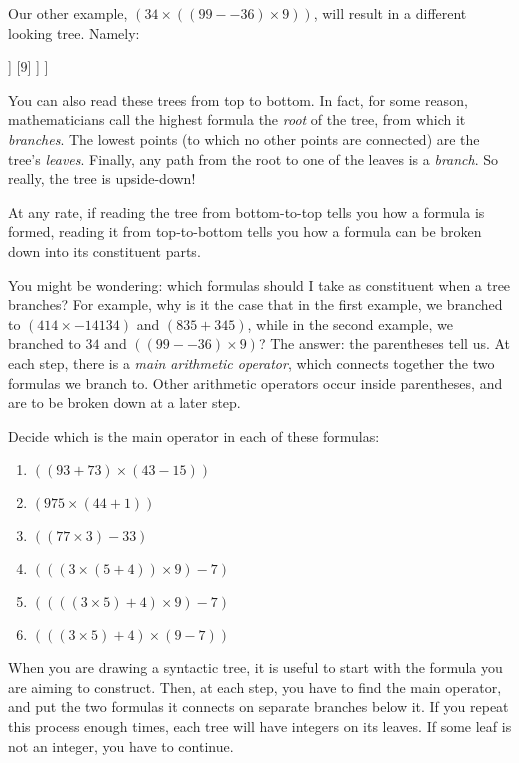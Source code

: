 Our other example, $(34 \times ((99- -36)\times 9))$, will result in a different looking tree. Namely:

\begin{center}
\begin{forest}
	[$(34 \times ((99- -36)\times 9))$
		[$34$]
		[$((99- -36)\times 9)$
			[$(99- -36)$
				[$99$]
				[$-36$]
			]
			[$9$]
		]
	]
\end{forest}
\end{center}

You can also read these trees from top to bottom. In fact, for some reason, mathematicians call the highest formula the \textit{root} of the tree, from which it \textit{branches}. The lowest points (to which no other points are connected) are the tree's \textit{leaves}. Finally, any path from the root to one of the leaves is a \textit{branch}. So really, the tree is upside-down! 

At any rate, if reading the tree from bottom-to-top tells you how a formula is formed, reading it from top-to-bottom tells you how a formula can be broken down into its constituent parts. 

You might be wondering: which formulas should I take as constituent when a tree branches? For example, why is it the case that in the first example, we branched to $(414 \times -14134)$ and $(835+345)$, while in the second example, we branched to $34$ and $((99- -36)\times 9)$? The answer: the parentheses tell us. At each step, there is a \textit{main arithmetic operator}, which connects together the two formulas we branch to. Other arithmetic operators occur inside parentheses, and are to be broken down at a later step. 

\begin{exc} \label{lae}
Decide which is the main operator in each of these formulas:

\begin{enumerate}
	\item $((93+73)\times(43-15))$
	\item $(975 \times (44+1))$
	\item $((77\times 3)- 33)$
	\item $(((3 \times (5+4)) \times 9)-7)$
	\item $((((3 \times 5)+4) \times 9)-7)$
	\item $(((3 \times 5)+4) \times (9-7))$
\end{enumerate}
\end{exc}

When you are drawing a syntactic tree, it is useful to start with the formula you are aiming to construct. Then, at each step, you have to find the main operator, and put the two formulas it connects on separate branches below it. If you repeat this process enough times, each tree will have integers on its leaves. If some leaf is not an integer, you have to continue. 

